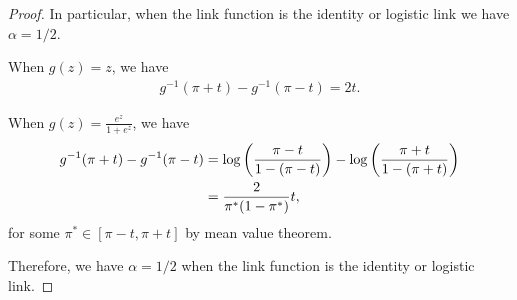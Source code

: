 \documentclass[11pt]{article}
\theoremstyle{plain}
\theoremstyle{definition}
\begin{document}
\begin{proof}
 In particular, when the link function is the identity or logistic link we have $\alpha = 1/2$.
 
 
 When $g(z) = z$, we have 
 \begin{align}
     g^{-1}(\pi+t)-g^{-1}(\pi-t) = 2t.
 \end{align}


 When $g(z) = \frac{e^z}{1+e^z}$, we have 
 \begin{align}
      g^{-1}(\pi+t)-g^{-1}(\pi-t) &=\log\left(\pi-t\over1-(\pi-t)\right)-\log\left(\pi+t\over1-(\pi+t)\right)\\&=\frac{2}{\pi^*(1-\pi^*)}t,
 \end{align}
 for some $\pi^*\in[\pi-t,\pi+t]$ by mean value theorem.
 
 Therefore, we have $\alpha = 1/2$ when the link function is the identity or logistic link.
 \end{proof}
\end{document}
